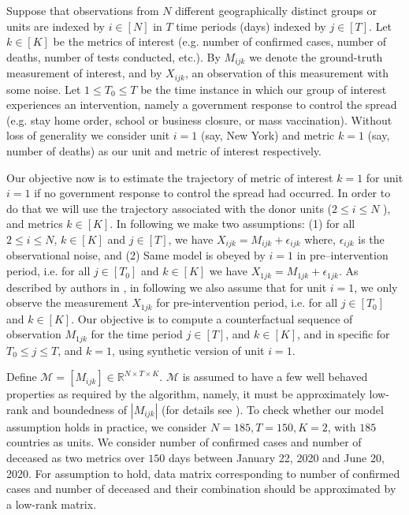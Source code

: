\documentclass[preprint,authoryear,12pt]{elsarticle}
\begin{document}
Suppose that observations from $N$ different geographically distinct groups or units are indexed by $i \in [N]$ in $T$ time periods (days) indexed by $j \in [T]$. Let $k \in [K]$ be the metrics of interest (e.g. number of confirmed cases, number of deaths, number of tests conducted, etc.). By $M_{ijk}$ we denote the ground-truth measurement of interest, and by $X_{ijk}$, an observation of this measurement with some noise. Let $1 \leq T_0 \leq T$ be the time instance in which our group of interest experiences an intervention, namely a government response to control the spread (e.g. stay home order, school or business closure, or mass vaccination). Without loss of generality we consider unit $i = 1$ (say, New York) and metric $k = 1$ (say, number of deaths) as our unit and metric of interest respectively.\par

Our objective now is to estimate the trajectory of metric of interest $k = 1$  for unit $i = 1$ if no government response to control the spread had occurred. In order to do that we will use the trajectory associated with the donor units ($2 \leq i \leq N$ ), and metrics $k \in [K ]$. In following we make two assumptions: (1) for all $2 \leq i \leq N$, $k \in [K]$ and $j \in [T]$, we have  $X_{ijk} = M_{ijk} + \epsilon_{ijk}$ where, $\epsilon_{ijk}$ is the observational noise, and (2) Same model is obeyed by $i=1$ in pre--intervention period, i.e. for all $j \in [T_0]$ and $k \in [K]$ we have $X_{1jk} = M_{1jk} + \epsilon_{1jk}$. As described by authors in \cite{AMSS19}, in following we also assume that for unit $i=1$, we only observe the measurement $X_{1jk}$ for pre-intervention period, i.e. for all $j \in [T_0]$ and $k \in [K]$. Our objective is to compute a counterfactual sequence of observation $M_{1jk}$ for the time period $j \in [T]$, and $k \in [K]$, and in specific for $T_0 \leq j \leq T$, and $k = 1$, using synthetic version of unit $i=1$.\par

Define $\mathcal{M} = [M_{ijk}] \in \mathbb{R}^{N \times T \times K}$. $\mathcal{M}$ is assumed to have a few well behaved properties as required by the algorithm, namely, it must be approximately low-rank and boundedness of $\left|M_{ijk}\right|$ (for details see \cite{AMSS19}). To check whether our model assumption holds in practice, we consider $N=185, T=150, K=2$, with $185$ countries as units. We consider number of confirmed cases and number of deceased as two metrics over $150$ days between January 22, 2020 and June 20, 2020. For assumption to hold, data matrix corresponding to number of confirmed cases and number of deceased and their combination should be approximated by a low-rank matrix. 
\end{document}
